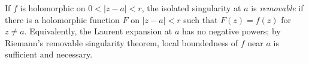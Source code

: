 
If $f$ is holomorphic on $0<|z-a|<r$, the isolated singularity at $a$ is \emph{removable} if there is a holomorphic function $F$ on $|z-a|<r$ such that $F(z)=f(z)$ for $z\ne a$. Equivalently, the Laurent expansion at $a$ has no negative powers; by Riemann's removable singularity theorem, local boundedness of $f$ near $a$ is sufficient and necessary.
